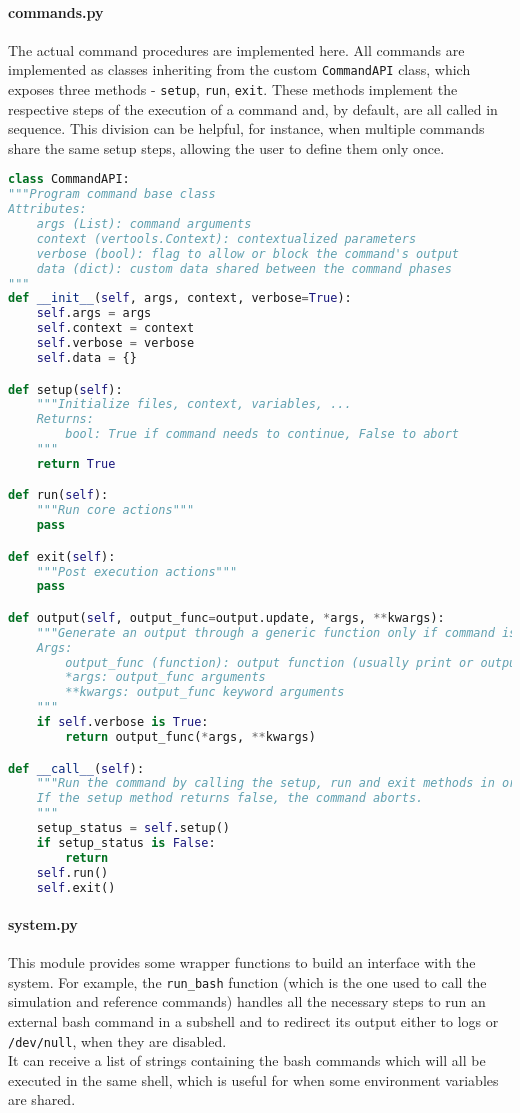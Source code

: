 \paragraph{commands.py} The actual command procedures are implemented here. All commands are implemented as classes inheriting from the custom \texttt{CommandAPI} class, which exposes three methods - \texttt{setup}, \texttt{run}, \texttt{exit}. These methods implement the respective steps of the execution of a command and, by default, are all called in sequence. This division can be helpful, for instance, when multiple commands share the same setup steps, allowing the user to define them only once.
\begin{lstlisting}[language=Python]
class CommandAPI:
"""Program command base class
Attributes:
    args (List): command arguments
    context (vertools.Context): contextualized parameters
    verbose (bool): flag to allow or block the command's output
    data (dict): custom data shared between the command phases
"""
def __init__(self, args, context, verbose=True):
    self.args = args
    self.context = context
    self.verbose = verbose
    self.data = {}

def setup(self):
    """Initialize files, context, variables, ...
    Returns:
        bool: True if command needs to continue, False to abort
    """
    return True

def run(self):
    """Run core actions"""
    pass

def exit(self):
    """Post execution actions"""
    pass

def output(self, output_func=output.update, *args, **kwargs):
    """Generate an output through a generic function only if command is set to verbose
    Args:
        output_func (function): output function (usually print or output.update)
        *args: output_func arguments
        **kwargs: output_func keyword arguments
    """
    if self.verbose is True:
        return output_func(*args, **kwargs)

def __call__(self):
    """Run the command by calling the setup, run and exit methods in order.
    If the setup method returns false, the command aborts.
    """
    setup_status = self.setup()
    if setup_status is False:
        return
    self.run()
    self.exit()
\end{lstlisting}

\paragraph{system.py} This module provides some wrapper functions to build an interface with the system. For example, the \texttt{run\_bash} function (which is the one used to call the simulation and reference commands) handles all the necessary steps to run an external bash command in a subshell and to redirect its output either to logs or \texttt{/dev/null}, when they are disabled.\\
It can receive a list of strings containing the bash commands which will all be executed in the same shell, which is useful for when some environment variables are shared.

